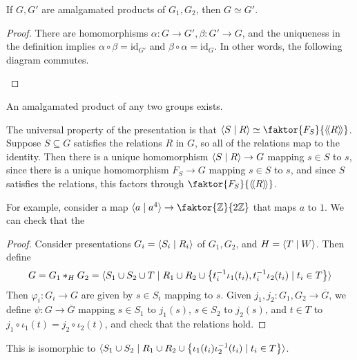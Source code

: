 \begin{proposition}
	If \( G, G' \) are amalgamated products of \( G_1, G_2 \), then \( G \simeq G' \).
\end{proposition}
\begin{proof}
	There are homomorphisms \( \alpha \colon G \to G', \beta \colon G' \to G \), and the uniqueness in the definition implies \( \alpha \circ \beta = \mathrm{id}_{G'} \) and \( \beta \circ \alpha = \mathrm{id}_G \).
	In other words, the following diagram commutes.
	\begin{center}
	\end{center}
\end{proof}
\begin{proposition}
	An amalgamated product of any two groups exists.
\end{proposition}
The universal property of the presentation is that \( \genset{S \mid R} \simeq \faktor{F_S}{\ngenset{R}} \).
Suppose \( S \subseteq G \) satisfies the relations \( R \) in \( G \), so all of the relations map to the identity.
Then there is a unique homomorphism \( \langle{} S \mid R \rangle \to G \) mapping \( s \in S \) to \( s \), since there is a unique homomorphism \( F_S \to G \) mapping \( s \in S \) to \( s \), and since \( S \) satisfies the relations, this factors through \( \faktor{F_S}{\ngenset{R}} \).

For example, consider a map \( \genset{a \mid a^4} \to \faktor{\mathbb Z}{2\mathbb Z} \) that maps \( a \) to \( 1 \).
We can check that the
\begin{proof}
	Consider presentations \( G_i = \langle{} S_i \mid R_i \rangle \) of \( G_1, G_2 \), and \( H = \langle{} T \mid W \rangle \).
	Then define
	\[ G = G_1 \ast_H G_2 = \langle{} S_1 \cup S_2 \cup T \mid R_1 \cup R_2 \cup \qty{t_i^{-1}\iota_1(t_i), t_i^{-1}\iota_2(t_i) \mid t_i \in T} \rangle \]
	Then \( \varphi_i \colon G_i \to G \) are given by \( s \in S_i \) mapping to \( s \).
	Given \( j_1, j_2 \colon G_1, G_2 \to \overline G \), we define \( \psi \colon G \to \overline G \) mapping \( s \in S_1 \) to \( j_1(s) \), \( s \in S_2 \) to \( j_2(s) \), and \( t \in T \) to \( j_1 \circ \iota_1(t) = j_2 \circ \iota_2(t) \), and check that the relations hold.
\end{proof}
This is isomorphic to \( \langle{} S_1 \cup S_2 \mid R_1 \cup R_2 \cup \qty{\iota_1(t_i) \iota_2^{-1}(t_i) \mid t_i \in T} \rangle \).

